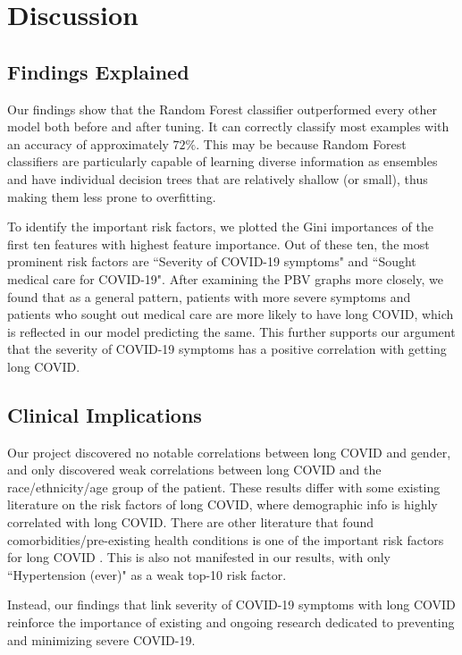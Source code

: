 \documentclass{article}
\begin{document}
\section{Discussion}
\label{discussion}
\subsection{Findings Explained}

Our findings show that the Random Forest classifier outperformed every other model both before and after tuning. It can correctly classify most examples with an accuracy of approximately $72\%$. This may be because Random Forest classifiers are particularly capable of learning diverse information as ensembles and have individual decision trees that are relatively shallow (or small), thus making them less prone to overfitting.

To identify the important risk factors, we plotted the Gini importances of the first ten features with highest feature importance. Out of these ten, the most prominent risk factors are ``Severity of COVID-19 symptoms" and ``Sought medical care for COVID-19". After examining the PBV graphs more closely, we found that as a general pattern, patients with more severe symptoms and patients who sought out medical care are more likely to have long COVID, which is reflected in our model predicting the same. This further supports our argument that the severity of COVID-19 symptoms has a positive correlation with getting long COVID.
\subsection{Clinical Implications} 

Our project discovered no notable correlations between long COVID and gender, and only discovered weak correlations between long COVID and the race/ethnicity/age group of the patient. These results differ with some existing literature on the risk factors of long COVID, where demographic info is highly correlated \citep{Nabavim3489} with long COVID. There are other literature that found comorbidities/pre-existing health conditions is one of the important risk factors for long COVID \citep{Osmanov2101341}. This is also not manifested in our results, with only ``Hypertension (ever)" as a weak top-10 risk factor. 

Instead, our findings that link severity of COVID-19 symptoms with long COVID reinforce the importance of existing and ongoing research dedicated to preventing and minimizing severe COVID-19.
\end{document}
